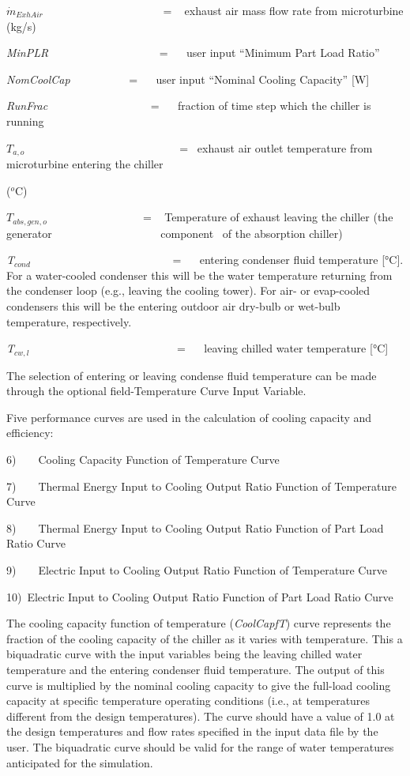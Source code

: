 \({\dot m_{ExhAir}}\) ~~~~~~ ~~~~~~~~~~~ ~~ = ~ exhaust air mass flow rate from microturbine (kg/s)

\emph{MinPLR~~~~~~~~~~~~~~~~~~~} = ~~ user input ``Minimum Part Load Ratio''

\emph{NomCoolCap}~~~~~~~~~~ = ~~ user input ``Nominal Cooling Capacity'' {[}W{]}

\emph{RunFrac}~~~~~~~~~~~~~~~~~~ = ~~ fraction of time step which the chiller is running

\({T_{a,o}}\) ~~~~~~~~~~~ ~~~~~~~~~~~~~~~ = ~exhaust air outlet temperature from microturbine entering the chiller

(\(^{o}\)C)

\({T_{abs,gen,o}}\) ~~~~~~~~~~~~~~~~ = ~ Temperature of exhaust leaving the chiller (the generator ~~~~~~~~~~~~~~~~~~~component~ of the absorption chiller)

\emph{T\(_{cond}\)}~~~~~~~~~~~~~~~~~~~~~~~~~ = ~~ entering condenser fluid temperature {[}°C{]}. For a water-cooled condenser this will be the water temperature returning from the condenser loop (e.g., leaving the cooling tower). For air- or evap-cooled condensers this will be the entering outdoor air dry-bulb or wet-bulb temperature, respectively.

\emph{T\(_{cw,l}\)}~~~~~~~~~~~~~~~~~~~~~~~~~~ = ~~ leaving chilled water temperature {[}°C{]}

The selection of entering or leaving condense fluid temperature can be made through the optional field-Temperature Curve Input Variable.

Five performance curves are used in the calculation of cooling capacity and efficiency:

6)~~~~Cooling Capacity Function of Temperature Curve

7)~~~~Thermal Energy Input to Cooling Output Ratio Function of Temperature Curve

8)~~~~Thermal Energy Input to Cooling Output Ratio Function of Part Load Ratio Curve

9)~~~~Electric Input to Cooling Output Ratio Function of Temperature Curve

10)~Electric Input to Cooling Output Ratio Function of Part Load Ratio Curve

The cooling capacity function of temperature (\emph{CoolCapfT}) curve represents the fraction of the cooling capacity of the chiller as it varies with temperature. This a biquadratic curve with the input variables being the leaving chilled water temperature and the entering condenser fluid temperature. The output of this curve is multiplied by the nominal cooling capacity to give the full-load cooling capacity at specific temperature operating conditions (i.e., at temperatures different from the design temperatures). The curve should have a value of 1.0 at the design temperatures and flow rates specified in the input data file by the user. The biquadratic curve should be valid for the range of water temperatures anticipated for the simulation.

